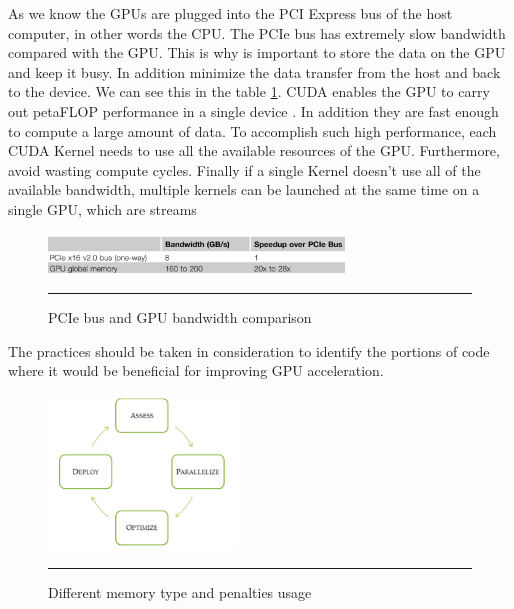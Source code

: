 As we know the GPUs are plugged into the PCI Express bus of the host computer, in other words the CPU. The PCIe bus has extremely slow bandwidth compared with the GPU. This is why is important to store the data on the GPU and keep it busy. In addition minimize the data transfer from the host and back to the device. We can see this in the table \ref{fig:PCI}. CUDA enables the GPU to carry out petaFLOP performance in a single device \cite{cook}. In addition they are fast enough to compute a large amount of data. To accomplish such high performance, each CUDA Kernel needs to use all the available resources of the GPU. Furthermore, avoid wasting compute cycles. Finally if a single Kernel doesn't use all of the available bandwidth, multiple kernels can be launched at the same time on a single GPU, which are streams \cite{design} 

\begin{figure}[htbp]
	\centering
		\includegraphics[width=0.7\textwidth]{Figures/PCI.png}
		\rule{35em}{0.5pt}
	\caption[PCIe Bandwidth]{PCIe bus and GPU bandwidth comparison }
	\label{fig:PCI}
\end{figure}

The practices should be taken in consideration to identify the portions of code where it would be beneficial for improving GPU acceleration.\cite{practices}

\begin{figure}[htbp]
	\centering
		\includegraphics[width=0.45\textwidth]{Figures/apod.png}
		\rule{35em}{0.5pt}
	\caption[Different memory types]{Different memory type and penalties usage}
	\label{fig:apod}
\end{figure}

